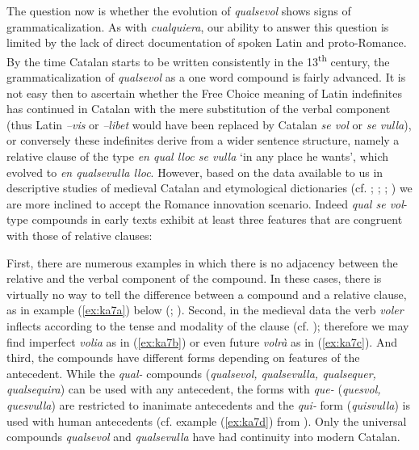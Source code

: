 \documentclass[output=paper,colorlinks,citecolor=brown]{langscibook}
\begin{document}
The question now is whether the evolution of \textit{qualsevol} shows signs of grammaticalization. As with \textit{cualquiera}, our ability to answer this question is limited by the lack of direct documentation of spoken Latin and proto-Romance. By the time Catalan starts to be written consistently in the 13\textsuperscript{th} century, the grammaticalization of \textit{qualsevol} as a one word compound is fairly advanced. It is not easy then to ascertain whether the Free Choice meaning of Latin indefinites has continued in Catalan with the mere substitution of the verbal component (thus Latin \textit{–vis} or \textit{–libet} would have been replaced by Catalan \textit{se vol} or \textit{se vulla}), or conversely these indefinites derive from a wider sentence structure, namely a relative clause of the type \textit{en qual lloc se vulla} ‘in any place he wants’, which evolved to \textit{en qualsevulla lloc}. However, based on the data available to us in descriptive studies of medieval Catalan and etymological dictionaries (cf. \cite{Alcovermoll1962}; \cite[][552]{BatlleOcerinjauregui2016}; \cite[][184]{Moll2006}; \cite[][VI: 889]{Coromines1985}) we are more inclined to accept the Romance innovation scenario. Indeed \textit{qual se vol}-type compounds in early texts exhibit at least three features that are congruent with those of relative clauses:

First, there are numerous examples in which there is no adjacency between the relative and the verbal component of the compound. In these cases, there is virtually no way to tell the difference between a compound and a relative clause, as in example (\ref{ex:ka7a}) below (\cite[][552]{BatlleOcerinjauregui2016}; \cite[][226]{BadiaiMargarit2004}). Second, in the medieval data the verb \textit{voler} inflects according to the tense and modality of the clause (cf. \cite[][VI:889]{Coromines1985}); therefore we may find imperfect \textit{volia} as in (\ref{ex:ka7b}) or even future \textit{volrà} as in (\ref{ex:ka7c}). And third, the compounds have different forms depending on features of the antecedent. While the \textit{qual-} compounds (\textit{qualsevol, qualsevulla, qualsequer, qualsequira}) can be used with any antecedent, the forms with \textit{que-} (\textit{quesvol, quesvulla}) are restricted to inanimate antecedents and the \textit{qui-} form (\textit{quisvulla}) is used with human antecedents (cf. example (\ref{ex:ka7d}) from \citealt{Alcovermoll1962}). Only the universal compounds \textit{qualsevol} and \textit{qualsevulla} have had continuity into modern Catalan.
\end{document}
